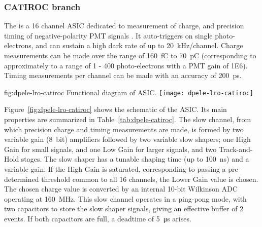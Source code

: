 \subsubsection{CATIROC branch} %

The  is a \num{16} channel ASIC dedicated to measurement of charge, and precision timing of negative-polarity PMT signals \cite{Blin:2017}. It auto-triggers on single photo-electrons, and can sustain a high dark rate of up to \SI{20} {kHz/channel}. Charge measurements can be made over the range of \SI{160}{fC} to \SI{70}{pC} (corresponding to approximately to a range of \num{1} - \num{400} photo-electrons with a PMT gain of \num{1E6}). Timing measurements per channel can be made with an accuracy of \SI{200}{ps}.

\begin{dunefigure}{fig:dpele-lro-catiroc}
{Functional diagram of  ASIC.}
\texttt{[image: dpele-lro-catiroc]}
\end{dunefigure}

Figure~\ref{fig:dpele-lro-catiroc} shows the schematic of the  ASIC. Its main properties are summarized in Table~\ref{tab:dpele-catiroc}. The slow channel, from which precision charge and timing measurements are made, is formed by two variable gain (\SI{8}{bit}) amplifiers followed by two variable slow shapers; one High Gain for small signals, and one Low Gain for larger signals, and two Track-and-Hold stages. The slow shaper has a tunable shaping time (up to \SI{100}{ns}) and a variable gain.  If the High Gain is saturated, corresponding to passing a pre-determined threshold common to all 16 channels, the Lower Gain value is chosen. The chosen charge value is converted by an internal 10-bit Wilkinson ADC operating at \SI{160}{MHz}.  This slow channel operates in a ping-pong mode, with two capacitors to store the slow shaper signals, giving an effective buffer of 2 events. If both capacitors are full, a deadtime of \SI{5}{\micro\second} arises.

